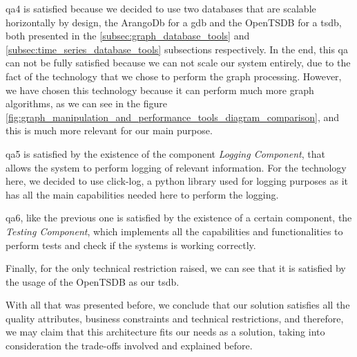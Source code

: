 \gls{qa}4 is satisfied because we decided to use two databases that are scalable horizontally by design, the ArangoDb for a \gls{gdb} and the OpenTSDB for a \gls{tsdb}, both presented in the \ref{subsec:graph_database_tools} and \ref{subsec:time_series_database_tools} subsections respectively. In the end, this \gls{qa} can not be fully satisfied because we can not scale our system entirely, due to the fact of the technology that we chose to perform the graph processing. However, we have chosen this technology because it can perform much more graph algorithms, as we can see in the figure \ref{fig:graph_manipulation_and_performance_tools_diagram_comparison}, and this is much more relevant for our main purpose.

\gls{qa}5 is satisfied by the existence of the component \textit{Logging Component}, that allows the system to perform logging of relevant information. For the technology here, we decided to use click-log\cite{click_log_doc}, a python library used for logging purposes as it has all the main capabilities needed here to perform the logging.

\gls{qa}6, like the previous one is satisfied by the existence of a certain component, the \textit{Testing Component}, which implements all the capabilities and functionalities to perform tests and check if the systems is working correctly.

Finally, for the only technical restriction raised, we can see that it is satisfied by the usage of the OpenTSDB as our \gls{tsdb}.

With all that was presented before, we conclude that our solution satisfies all the quality attributes, business constraints and technical restrictions, and therefore, we may claim that this architecture fits our needs as a solution, taking into consideration the trade-offs involved and explained before.


\checkoddpage
{}
{ %
\newpage
\blankpage}
{ %
}
